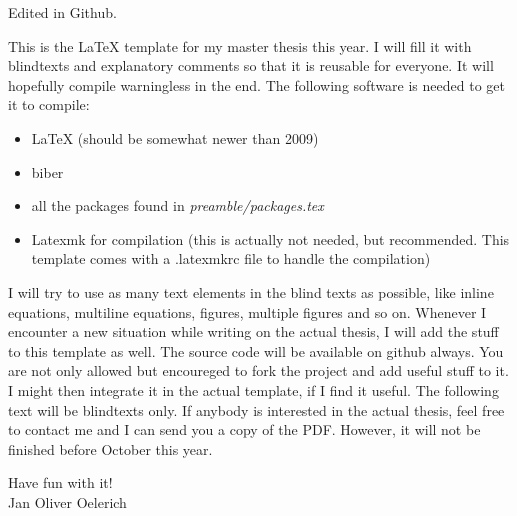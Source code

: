 \label{cha:introduction}

Edited in Github.

This is the \LaTeX{} template for my master thesis this year. I will fill
it with blindtexts and explanatory comments so that it is reusable for
everyone. It will hopefully compile warningless in the end. The following
software is needed to get it to compile:
\begin{itemize}
  \item LaTeX (should be somewhat newer than 2009)
  \item biber
  \item all the packages found in \emph{preamble/packages.tex}
  \item Latexmk for compilation (this is actually not needed, but
  recommended. This template comes with a .latexmkrc file to handle the
  compilation) 
\end{itemize}
I will try to use as many text elements in the blind texts as possible,
like inline equations, multiline equations, figures, multiple figures and
so on. Whenever I encounter a new situation while writing on the actual
thesis, I will add the stuff to this template as well.
The source code will be available on github always. You are not only
allowed but encoureged to fork the project and add useful stuff to it. I
might then integrate it in the actual template, if I find it useful.
The following text will be blindtexts only. If anybody is interested in the
actual thesis, feel free to contact me and I can send you a copy of the
PDF. However, it will not be finished before October this year.

\vspace{.5cm}

Have fun with it! \\
Jan Oliver Oelerich
